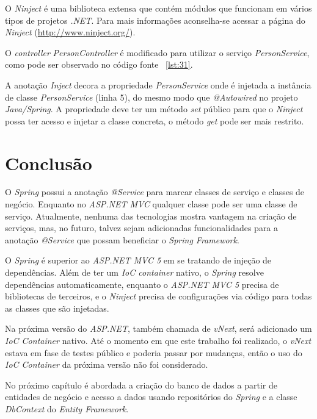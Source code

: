 O \textit{Ninject} é uma biblioteca extensa que contém módulos que funcionam em vários tipos de projetos \textit{.NET}. Para mais informações aconselha-se acessar a página do \textit{Ninject} (\url{http://www.ninject.org/}).

O \textit{controller} \textit{PersonController} é modificado para utilizar o serviço \textit{PersonService}, como pode ser observado no código fonte ~\ref{lst:31}.


A anotação \textit{Inject} decora a propriedade \textit{PersonService} onde é injetada a instância de classe \textit{PersonService} (linha 5), do mesmo modo que \textit{@Autowired} no projeto \textit{Java/Spring}. A propriedade deve ter um método \textit{set} público para que o \textit{Ninject} possa ter acesso e injetar a classe concreta, o método \textit{get} pode ser mais restrito.

\section{Conclusão}

O \textit{Spring} possui a anotação \textit{@Service} para marcar classes de serviço e classes de negócio. Enquanto no \textit{ASP.NET MVC} qualquer classe pode ser uma classe de serviço. Atualmente, nenhuma das tecnologias mostra vantagem na criação de serviços, mas, no futuro, talvez sejam adicionadas funcionalidades para a anotação \textit{@Service} que possam beneficiar o \textit{Spring Framework}.

O \textit{Spring} é superior ao \textit{ASP.NET MVC 5} em se tratando de injeção de dependências. Além de ter um \textit{IoC container} nativo, o \textit{Spring} resolve dependências automaticamente, enquanto o \textit{ASP.NET MVC 5} precisa de bibliotecas de terceiros, e o \textit{Ninject} precisa de configurações via código para todas as classes que são injetadas.

Na próxima versão do \textit{ASP.NET}, também chamada de \textit{vNext}, será adicionado um \textit{IoC Container} nativo. Até o momento em que este trabalho foi realizado, o \textit{vNext} estava em fase de testes público e poderia passar por mudanças, então o uso do \textit{IoC Container} da próxima versão não foi considerado.

No próximo capítulo é abordada a criação do banco de dados a partir de entidades de negócio e acesso a dados usando repositórios do \textit{Spring} e a classe \textit{DbContext} do \textit{Entity Framework}.